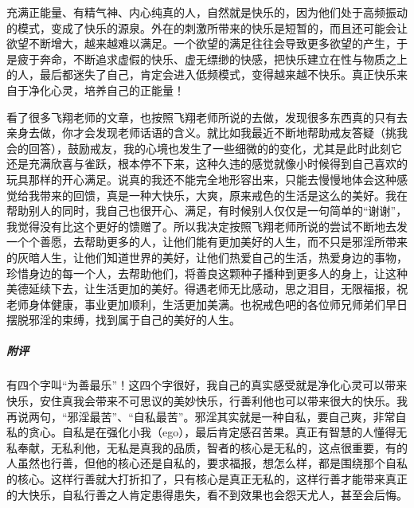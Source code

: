 \begin{case}
    充满正能量、有精气神、内心纯真的人，自然就是快乐的，因为他们处于高频振动的模式，变成了快乐的源泉。外在的刺激所带来的快乐是短暂的，而且还可能会让欲望不断增大，越来越难以满足。一个欲望的满足往往会导致更多欲望的产生，于是疲于奔命，不断追求虚假的快乐、虚无缥缈的快感，把快乐建立在性与物质之上的人，最后都迷失了自己，肯定会进入低频模式，变得越来越不快乐。真正快乐来自于净化心灵，培养自己的正能量！
\end{case}

\begin{case}
    看了很多飞翔老师的文章，也按照飞翔老师所说的去做，发现很多东西真的只有去亲身去做，你才会发现老师话语的含义。就比如我最近不断地帮助戒友答疑（挑我会的回答），鼓励戒友，我的心境也发生了一些细微的的变化，尤其是此时此刻它还是充满欣喜与雀跃，根本停不下来，这种久违的感觉就像小时候得到自己喜欢的玩具那样的开心满足。说真的我还不能完全地形容出来，只能去慢慢地体会这种感觉给我带来的回馈，真是一种大快乐，大爽，原来戒色的生活是这么的美好。我在帮助别人的同时，我自己也很开心、满足，有时候别人仅仅是一句简单的“谢谢”，我觉得没有比这个更好的馈赠了。所以我决定按照飞翔老师所说的尝试不断地去发一个个善愿，去帮助更多的人，让他们能有更加美好的人生，而不只是邪淫所带来的灰暗人生，让他们知道世界的美好，让他们热爱自己的生活，热爱身边的事物，珍惜身边的每一个人，去帮助他们，将善良这颗种子播种到更多人的身上，让这种美德延续下去，让生活更加的美好。得遇老师无比感动，思之泪目，无限福报，祝老师身体健康，事业更加顺利，生活更加美满。也祝戒色吧的各位师兄师弟们早日摆脱邪淫的束缚，找到属于自己的美好的人生。
    \subparagraph{附评} 有四个字叫“为善最乐”！这四个字很好，我自己的真实感受就是净化心灵可以带来快乐，安住真我会带来不可思议的美妙快乐，行善利他也可以带来很大的快乐。我再说两句，“邪淫最苦”、“自私最苦”。邪淫其实就是一种自私，要自己爽，非常自私的贪心。自私是在强化小我（ego），最后肯定感召苦果。真正有智慧的人懂得无私奉献，无私利他，无私是真我的品质，智者的核心是无私的，这点很重要，有的人虽然也行善，但他的核心还是自私的，要求福报，想怎么样，都是围绕那个自私的核心。这样行善就大打折扣了，只有核心是真正无私的，这样行善才能带来真正的大快乐，自私行善之人肯定患得患失，看不到效果也会怨天尤人，甚至会后悔。


\end{case}
